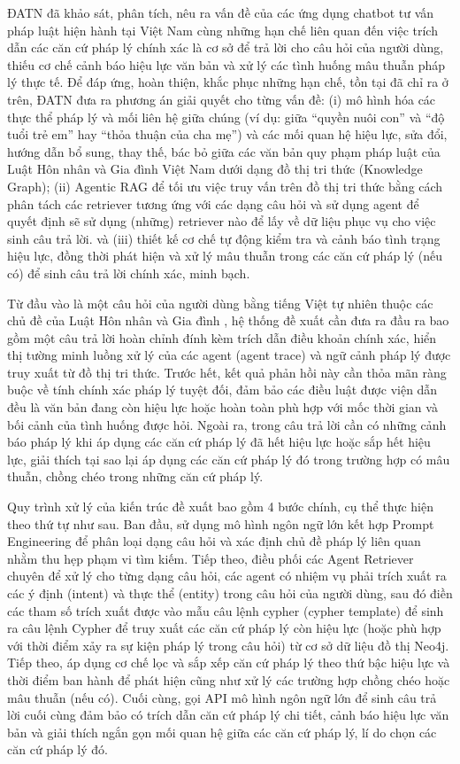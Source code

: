 \documentclass[../DoAn.tex]{subfiles}
\begin{document}
ĐATN đã khảo sát, phân tích, nêu ra vấn đề của các ứng dụng chatbot tư vấn pháp luật hiện hành tại Việt Nam cùng những hạn chế liên quan đến việc trích dẫn các căn cứ pháp lý chính xác là cơ sở để trả lời cho câu hỏi của người dùng, thiếu cơ chế cảnh báo hiệu lực văn bản và xử lý các tình huống mâu thuẫn pháp lý thực tế. Để đáp ứng, hoàn thiện, khắc phục những hạn chế, tồn tại đã chỉ ra ở trên, ĐATN đưa ra phương án giải quyết cho từng vấn đề: (i) mô hình hóa các thực thể pháp lý và mối liên hệ giữa chúng (ví dụ: giữa “quyền nuôi con” và “độ tuổi trẻ em” hay “thỏa thuận của cha mẹ”) và các mối quan hệ hiệu lực, sửa đổi, hướng dẫn bổ sung, thay thế, bác bỏ giữa các văn bản quy phạm pháp luật của Luật Hôn nhân và Gia đình Việt Nam dưới dạng đồ thị tri thức (Knowledge Graph); (ii) Agentic RAG để tối ưu việc truy vấn trên đồ thị tri thức bằng cách phân tách các retriever tương ứng với các dạng câu hỏi và sử dụng agent để quyết định sẽ sử dụng (những) retriever nào để lấy về dữ liệu phục vụ cho việc sinh câu trả lời. và (iii) thiết kế cơ chế tự động kiểm tra và cảnh báo tình trạng hiệu lực, đồng thời phát hiện và xử lý mâu thuẫn trong các căn cứ pháp lý (nếu có) để sinh câu trả lời chính xác, minh bạch.

Từ đầu vào là một câu hỏi của người dùng bằng tiếng Việt tự nhiên thuộc các chủ đề của Luật Hôn nhân và Gia đình , hệ thống đề xuất cần đưa ra đầu ra bao gồm một câu trả lời hoàn chỉnh đính kèm trích dẫn điều khoản chính xác, hiển thị tường minh luồng xử lý của các agent (agent trace) và ngữ cảnh pháp lý được truy xuất từ đồ thị tri thức. Trước hết, kết quả phản hồi này cần thỏa mãn ràng buộc về tính chính xác pháp lý tuyệt đối, đảm bảo các điều luật được viện dẫn đều là văn bản đang còn hiệu lực hoặc hoàn toàn phù hợp với mốc thời gian và bối cảnh của tình huống được hỏi. Ngoài ra, trong câu trả lời cần có những cảnh báo pháp lý khi áp dụng các căn cứ pháp lý đã hết hiệu lực hoặc sắp hết hiệu lực, giải thích tại sao lại áp dụng các căn cứ pháp lý đó trong trường hợp có mâu thuẫn, chồng chéo trong những căn cứ pháp lý.

Quy trình xử lý của kiến trúc đề xuất bao gồm 4 bước chính, cụ thể thực hiện theo thứ tự như sau. Ban đầu, sử dụng mô hình ngôn ngữ lớn kết hợp Prompt Engineering để phân loại dạng câu hỏi và xác định chủ đề pháp lý liên quan nhằm thu hẹp phạm vi tìm kiếm. Tiếp theo, điều phối các Agent Retriever chuyên để xử lý cho từng dạng câu hỏi, các agent có nhiệm vụ phải trích xuất ra các ý định (intent) và thực thể (entity) trong câu hỏi của người dùng, sau đó điền các tham số trích xuất được vào mẫu câu lệnh cypher (cypher template) để sinh ra câu lệnh Cypher để truy xuất các căn cứ pháp lý còn hiệu lực (hoặc phù hợp với thời điểm xảy ra sự kiện pháp lý trong câu hỏi) từ cơ sở dữ liệu đồ thị Neo4j. Tiếp theo, áp dụng cơ chế lọc và sắp xếp căn cứ pháp lý theo thứ bậc hiệu lực và thời điểm ban hành để phát hiện cũng như xử lý các trường hợp chồng chéo hoặc mâu thuẫn (nếu có). Cuối cùng, gọi API mô hình ngôn ngữ lớn để sinh câu trả lời cuối cùng đảm bảo có trích dẫn căn cứ pháp lý chi tiết, cảnh báo hiệu lực văn bản và giải thích ngắn gọn mối quan hệ giữa các căn cứ pháp lý, lí do chọn các căn cứ pháp lý đó. 
\end{document}
